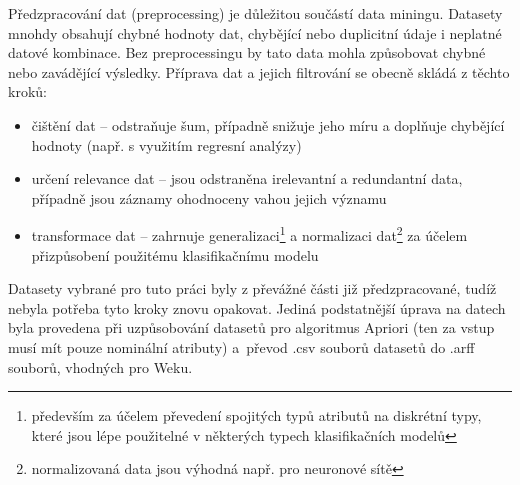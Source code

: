\documentclass[12pt]{article}
\begin{document}
Předzpracování dat (preprocessing) je důležitou součástí data miningu. Datasety mnohdy obsahují chybné hodnoty dat, chybějící nebo duplicitní údaje i neplatné datové kombinace. Bez preprocessingu by tato data mohla způsobovat chybné nebo zavádějící výsledky. Příprava dat a jejich filtrování se obecně skládá z těchto kroků:
\begin{itemize}
\item čištění dat – odstraňuje šum, případně snižuje jeho míru a doplňuje chybějící hodnoty (např. s
využitím regresní analýzy)
\item určení relevance dat – jsou odstraněna irelevantní a redundantní data, případně jsou záznamy
ohodnoceny vahou jejich významu
\item transformace dat – zahrnuje generalizaci\footnote{především za účelem převedení spojitých typů atributů na diskrétní typy, které jsou lépe použitelné v některých typech
klasifikačních modelů}
a normalizaci dat\footnote{normalizovaná data jsou výhodná např. pro neuronové sítě} za účelem přizpůsobení použitému klasifikačnímu modelu \citep{rychly}
\end{itemize}

Datasety vybrané pro tuto práci byly z převážné části již předzpracované, tudíž nebyla potřeba tyto kroky znovu opakovat. Jediná podstatnější úprava na datech byla provedena při uzpůsobování datasetů pro algoritmus Apriori (ten za vstup musí mít pouze nominální atributy) a~převod .csv souborů datasetů do .arff souborů, vhodných pro Weku. 
\end{document}
